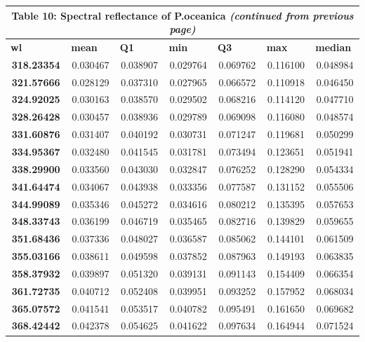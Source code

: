 \documentclass[10pt, a4paper]{article}
\begin{document}
\begin{appendices}
\begin{longtable}{|c|c|c|c|c|c|c|}
\multicolumn{7}{c}{Table 10: Spectral reflectance of \textbf{P.oceanica} \textit{(continued from previous page)}}\\
\hline \multicolumn{1}{|l|}{\textbf{wl}} & \multicolumn{1}{l|}{\textbf{mean}} & \multicolumn{1}{l|}{\textbf{Q1}} & \multicolumn{1}{l|}{\textbf{min}} & \multicolumn{1}{l|}{\textbf{Q3}} & \multicolumn{1}{l|}{\textbf{max}} & \multicolumn{1}{l|}{\textbf{median}} \\ \hline
\endhead

\textbf{318.23354} & 0.030467 & 0.038907 & 0.029764 & 0.069762 & 0.116100 & 0.048984 \\ \hline
\textbf{321.57666} & 0.028129 & 0.037310 & 0.027965 & 0.066572 & 0.110918 & 0.046450 \\ \hline
\textbf{324.92025} & 0.030163 & 0.038570 & 0.029502 & 0.068216 & 0.114120 & 0.047710 \\ \hline
\textbf{328.26428} & 0.030457 & 0.038936 & 0.029789 & 0.069098 & 0.116080 & 0.048574 \\ \hline
\textbf{331.60876} & 0.031407 & 0.040192 & 0.030731 & 0.071247 & 0.119681 & 0.050299 \\ \hline
\textbf{334.95367} & 0.032480 & 0.041545 & 0.031781 & 0.073494 & 0.123651 & 0.051941 \\ \hline
\textbf{338.29900} & 0.033560 & 0.043030 & 0.032847 & 0.076252 & 0.128290 & 0.054334 \\ \hline
\textbf{341.64474} & 0.034067 & 0.043938 & 0.033356 & 0.077587 & 0.131152 & 0.055506 \\ \hline
\textbf{344.99089} & 0.035346 & 0.045272 & 0.034616 & 0.080212 & 0.135395 & 0.057653 \\ \hline
\textbf{348.33743} & 0.036199 & 0.046719 & 0.035465 & 0.082716 & 0.139829 & 0.059655 \\ \hline
\textbf{351.68436} & 0.037336 & 0.048027 & 0.036587 & 0.085062 & 0.144101 & 0.061509 \\ \hline
\textbf{355.03166} & 0.038611 & 0.049598 & 0.037852 & 0.087963 & 0.149193 & 0.063835 \\ \hline
\textbf{358.37932} & 0.039897 & 0.051320 & 0.039131 & 0.091143 & 0.154409 & 0.066354 \\ \hline
\textbf{361.72735} & 0.040712 & 0.052408 & 0.039951 & 0.093252 & 0.157952 & 0.068034 \\ \hline
\textbf{365.07572} & 0.041541 & 0.053517 & 0.040782 & 0.095491 & 0.161650 & 0.069682 \\ \hline
\textbf{368.42442} & 0.042378 & 0.054625 & 0.041622 & 0.097634 & 0.164944 & 0.071524 \\ \hline

\end{longtable}
\end{appendices}
\end{document}
